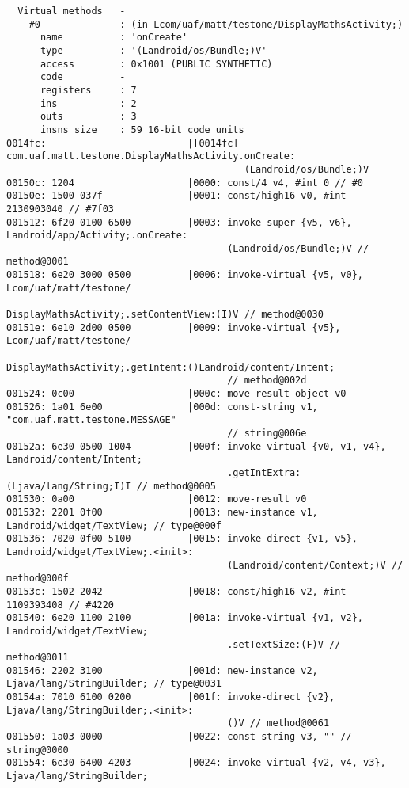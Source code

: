 \begin{lstlisting}
  Virtual methods   -
    #0              : (in Lcom/uaf/matt/testone/DisplayMathsActivity;)
      name          : 'onCreate'
      type          : '(Landroid/os/Bundle;)V'
      access        : 0x1001 (PUBLIC SYNTHETIC)
      code          -
      registers     : 7
      ins           : 2
      outs          : 3
      insns size    : 59 16-bit code units
0014fc:                         |[0014fc] com.uaf.matt.testone.DisplayMathsActivity.onCreate:
                                          (Landroid/os/Bundle;)V
00150c: 1204                    |0000: const/4 v4, #int 0 // #0
00150e: 1500 037f               |0001: const/high16 v0, #int 2130903040 // #7f03
001512: 6f20 0100 6500          |0003: invoke-super {v5, v6}, Landroid/app/Activity;.onCreate:
                                       (Landroid/os/Bundle;)V // method@0001
001518: 6e20 3000 0500          |0006: invoke-virtual {v5, v0}, Lcom/uaf/matt/testone/
                                       DisplayMathsActivity;.setContentView:(I)V // method@0030
00151e: 6e10 2d00 0500          |0009: invoke-virtual {v5}, Lcom/uaf/matt/testone/
                                       DisplayMathsActivity;.getIntent:()Landroid/content/Intent;
                                       // method@002d
001524: 0c00                    |000c: move-result-object v0
001526: 1a01 6e00               |000d: const-string v1, "com.uaf.matt.testone.MESSAGE"
                                       // string@006e
00152a: 6e30 0500 1004          |000f: invoke-virtual {v0, v1, v4}, Landroid/content/Intent;
                                       .getIntExtra:(Ljava/lang/String;I)I // method@0005
001530: 0a00                    |0012: move-result v0
001532: 2201 0f00               |0013: new-instance v1, Landroid/widget/TextView; // type@000f
001536: 7020 0f00 5100          |0015: invoke-direct {v1, v5}, Landroid/widget/TextView;.<init>:
                                       (Landroid/content/Context;)V // method@000f
00153c: 1502 2042               |0018: const/high16 v2, #int 1109393408 // #4220
001540: 6e20 1100 2100          |001a: invoke-virtual {v1, v2}, Landroid/widget/TextView;
                                       .setTextSize:(F)V // method@0011
001546: 2202 3100               |001d: new-instance v2, Ljava/lang/StringBuilder; // type@0031
00154a: 7010 6100 0200          |001f: invoke-direct {v2}, Ljava/lang/StringBuilder;.<init>:
                                       ()V // method@0061
001550: 1a03 0000               |0022: const-string v3, "" // string@0000
001554: 6e30 6400 4203          |0024: invoke-virtual {v2, v4, v3}, Ljava/lang/StringBuilder;

\end{lstlisting}
